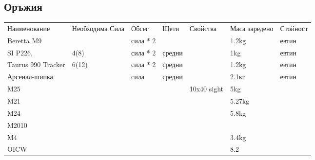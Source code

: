 \subsection{Оръжия}
\begin{tabular}{p{2cm} | p{2cm} | p{2cm} | p{2cm} | p{2cm} | p{2cm} | p{2cm}}
Наименование          & Необходима Сила      & Обсег      & Щети       & Свойства       & Маса заредено & Стойност         \\
Beretta M9            &                      & сила * 2   &            &                & 1.2kg         & евтин            \\  %
SI P226,              & 4(8)                 & сила * 2   & средни     &                & 1kg           & евтин            \\  %
Taurus 990 Tracker    & 6(12)                & сила * 2   & средни     &                & 1.2kg         & евтин            \\  %
Арсенал-шипка         &                      & сила       & средни     &                & 2.1кг         & евтин            \\  %
M25                   &                      &            &            & 10x40 sight    & 5kg           &                  \\  %
M21                   &                      &            &            &                & 5.27kg        &                  \\  %
M24                   &                      &            &            &                & 5.8kg         &                  \\  %
M2010                 &                      &            &            &                &               &                  \\
M4                    &                      &            &            &                & 3.4kg         &                  \\  %
OICW                  &                      &            &            &                & 8.2           &                  \\  %

\end{tabular}

